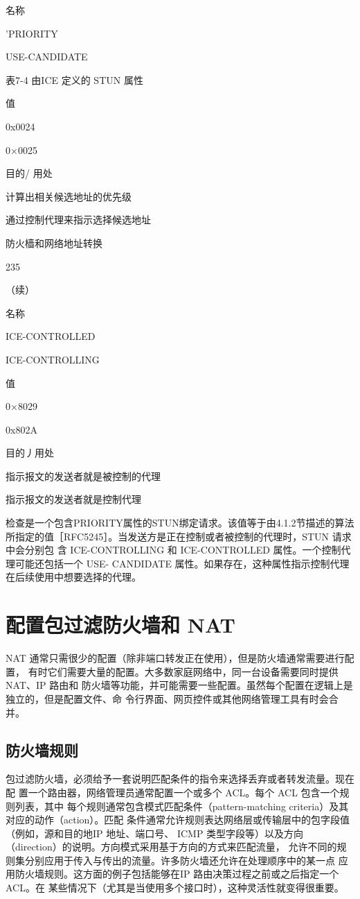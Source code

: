 名称

'PRIORITY

USE-CANDIDATE

表7-4 由ICE 定义的 STUN 属性

值

0x0024

0×0025

目的/ 用处

计算出相关候选地址的优先级

通过控制代理来指示选择候选地址

防火樯和网络地址转换

235

（续）

名称

ICE-CONTROLLED

ICE-CONTROLLING

值

0×8029

0x802A

目的丿用处

指示报文的发送者就是被控制的代理

指示报文的发送者就是控制代理

检查是一个包含PRIORITY属性的STUN绑定请求。该值等于由4.1.2节描述的算法
所指定的值［RFC5245］。当发送方是正在控制或者被控制的代理时，STUN 请求中会分别包
含 ICE-CONTROLLING 和 ICE-CONTROLLED 属性。一个控制代理可能还包括一个 USE-
CANDIDATE 属性。如果存在，这种属性指示控制代理在后续使用中想要选择的代理。

\section{配置包过滤防火墙和 NAT}

NAT 通常只需很少的配置（除非端口转发正在使用），但是防火墙通常需要进行配置，
有时它们需要大量的配置。大多数家庭网络中，同一台设备需要同时提供NAT、IP 路由和
防火墙等功能，并可能需要一些配置。虽然每个配置在逻辑上是独立的，但是配置文件、命
令行界面、网页控件或其他网络管理工具有时会合并。

\subsection{防火墙规则}

包过滤防火墙，必须给予一套说明匹配条件的指令来选择丢弃或者转发流量。现在配
置一个路由器，网络管理员通常配置一个或多个 ACL。每个 ACL 包含一个规则列表，其中
每个规则通常包含模式匹配条件（pattern-matching criteria）及其对应的动作（action）。匹配
条件通常允许规则表达网络层或传输层中的包字段值（例如，源和目的地IP 地址、端口号、
ICMP 类型字段等）以及方向（direction）的说明。方向模式采用基于方向的方式来匹配流量，
允许不同的规则集分别应用于传入与传出的流量。许多防火墙还允许在处理顺序中的某一点
应用防火墙规则。这方面的例子包括能够在IP 路由决策过程之前或之后指定一个ACL。在
某些情况下（尤其是当使用多个接口时），这种灵活性就变得很重要。

